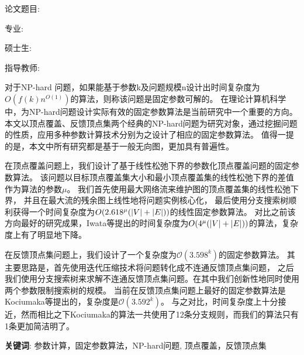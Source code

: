 ﻿

\setcounter{page}{1}
\renewcommand{\thepage}{\Roman{page}}
\setlength{\parindent}{0em}
论文题目: \,\ctitle

专\hspace{2em}业: \,\major

硕\hspace{0.5em}士\hspace{0.5em}生: \,\cauthor

指导教师: \,\supervisor
\setlength{\parindent}{2em}

\vspace{1.2cm}
 \centerline{}
\vspace{0.3cm}
对于NP-hard 问题，如果能基于参数k及问题规模n设计出时间复杂度为$O(f(k)n^{O(1)})$的算法，则称该问题是固定参数可解的。
在理论计算机科学中，为NP-hard问题设计实际有效的固定参数算法是当前研究中一个重要的方向。
本文以顶点覆盖、反馈顶点集两个经典的NP-hard问题为研究对象，通过挖掘问题的性质，应用多种参数计算技术分别为之设计了相应的固定参数算法。
值得一提的是，本文中所有研究都是基于一般无向图，更加具有普遍性。

在顶点覆盖问题上，我们设计了基于线性松弛下界的参数化顶点覆盖问题的固定参数算法。
该问题以目标顶点覆盖集大小和最小顶点覆盖集的线性松弛下界的差值作为算法的参数$\mu$。
我们首先使用最大网络流来维护图的顶点覆盖集的线性松弛下界，
并且在最大流的残余图上线性地将问题实例核心化，
最后使用分支搜索树顺利获得一个时间复杂度为$O(2.618^\mu(\left\vert V \right\vert + \left\vert E \right\vert))$的线性固定参数算法。
对比之前该方向最好的研究成果，Iwata等提出的时间复杂度为$O(4^\mu(\left\vert V \right\vert + \left\vert E \right\vert))$的算法，复杂度上有了明显地下降。

在反馈顶点集问题上，我们设计了一个复杂度为$\mathcal{O}(3.598^k)$的固定参数算法。
其主要思路是，首先使用迭代压缩技术将问题转化成不连通反馈顶点集问题，
之后我们使用分支搜索树来求解不连通反馈顶点集问题。在其中我们创新性地同时使用两个参数限制搜索树的规模。
当前在反馈顶点集问题上最好的固定参数算法是Kociumaka等提出的，复杂度是$\mathcal{O}(3.592^k)$。
与之对比，时间复杂度上十分接近，然而相比之下Kociumaka的算法一共使用了12条分支规则，而我们的算法只有1条更加简洁明了。

\vspace{1cm}

{\noindent\hei \textbf{关键词}}: {参数计算，固定参数算法，NP-hard问题, 顶点覆盖，反馈顶点集}
